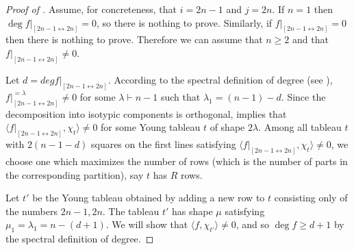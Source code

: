 \documentclass{article}
\theoremstyle{definition}
\providecommand{\dcoset}[2]{[#1 \leftrightarrow #2]}
\begin{document}
\begin{proof}[Proof of ]
Assume, for concreteness, that $i=2n-1$ and $j=2n$. If $n = 1$ then $\deg f|_{\dcoset{2n-1}{2n}} = 0$, so there is nothing to prove. Similarly, if $f|_{\dcoset{2n-1}{2n}} = 0$ then there is nothing to prove. Therefore we can assume that $n \geq 2$ and that $f|_{\dcoset{2n-1}{2n}} \neq 0$.

Let $d = deg f|_{\dcoset{2n-1}{2n}}$. According to the spectral definition of degree (see ), $f|_{\dcoset{2n-1}{2n}}^{=\lambda} \neq 0$ for some $\lambda \vdash n-1$ such that $\lambda_1 = (n-1)-d$. Since the decomposition into isotypic components is orthogonal,  implies that $\langle f|_{\dcoset{2n-1}{2n}}, \chi_t \rangle \neq 0$ for some Young tableau $t$ of shape $2\lambda$. Among all tableau $t$ with $2(n-1-d)$ squares on the first lines satisfying $\langle f|_{\dcoset{2n-1}{2n}}, \chi_t \rangle \neq 0$, we choose one which maximizes the number of rows (which is the number of parts in the corresponding partition), say $t$ has $R$ rows.

Let $t'$ be the Young tableau obtained by adding a new row to $t$ consisting only of the numbers $2n-1,2n$. The tableau $t'$ has shape $\mu$ satisfying $\mu_1 = \lambda_1 = n - (d+1)$. We will show that $\langle f, \chi_{t'} \rangle \neq 0$, and so $\deg f \geq d+1$ by the spectral definition of degree.


\end{proof}
\end{document}
